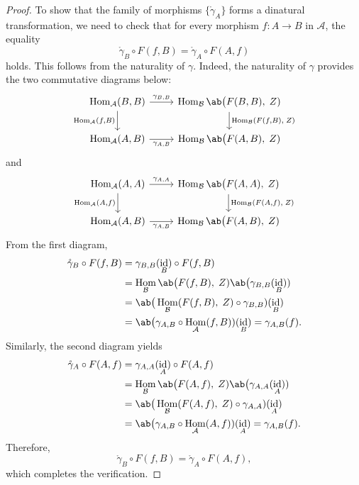 \documentclass[12pt, english]{article}
\numberwithin{equation}{section}
\DeclareMathOperator{\Hom}{Hom}
\DeclareMathOperator{\id}{id}
\theoremstyle{plain}
\theoremstyle{definition}
\theoremstyle{remark}
\begin{document}
	\begin{proof}
		
		To show that the family of morphisms  $\{\mathring{\gamma}_A\}$ forms a dinatural transformation,
		we need to check that for every morphism  $f \colon A \to B$ in $\mathcal{A}$, the equality
		\[
		\mathring{\gamma}_B \circ F(f, B) = \mathring{\gamma}_A \circ F(A, f)
		\]
		holds.  This follows from the naturality of $\gamma$.
		Indeed, the naturality of $\gamma$ provides the two commutative diagrams below:
		\[
		\begin{tikzcd}
			{\Hom_{\mathcal{A}}(B, B)} \arrow[r, "{\gamma_{B, B}}"] \arrow[d, "{\Hom_{\mathcal{A}}(f, B)  }"']
			& {\Hom_{\mathcal{B}} \ab\big(F(B, B), \; Z) } \arrow[d, "{\Hom_{\mathcal{B}}(F(f, B), \;  Z)}"] \\
			{ \Hom_{\mathcal{A}}(A, B) } \arrow[r, "{ \gamma_{A, B} }"'] & \Hom_{\mathcal{B}} \ab\big(F(A, B), \;  Z)
		\end{tikzcd}
		\]
		and
		\[
		\begin{tikzcd}
			{\Hom_{\mathcal{A}}(A, A)} \arrow[r, "{\gamma_{A, A}}"] \arrow[d, "{\Hom_{\mathcal{A}}(A, f)  }"']
			& {\Hom_{\mathcal{B}} \ab\big(F(A, A), \;  Z)} \arrow[d, "{\Hom_{\mathcal{B}} (F(A, f), \;  Z)}"] \\
			{ \Hom_{ \mathcal{A} }(A, B) } \arrow[r, "{ \gamma_{A, B} }"'] & \Hom_{\mathcal{B}} \ab\big(F(A, B), \;  Z)
		\end{tikzcd}
		\]
		From the first diagram,
		\begin{equation}\label{eq:diagonal-naturality}
			\begin{aligned}
				\mathring{\gamma}_B \circ F(f, B) & = \gamma_{B, B}(\id_B) \circ F(f, B) \\
				& = \Hom_{\mathcal{B}} \ab\big(F(f, B), \; Z) \ab\big(\gamma_{B, B} (\id_B)) \\
				& = \ab\big(\Hom_{\mathcal{B}}(F(f, B), \; Z) \circ \gamma_{B, B}) (\id_B) \\
				& = \ab\big(\gamma_{A, B} \circ \Hom_{\mathcal{A}}(f, B)) (\id_B) = \gamma_{A, B}(f).
			\end{aligned}
		\end{equation}
		Similarly, the second diagram yields
		\begin{align*}
			\mathring{\gamma}_A \circ F(A, f) & = \gamma_{A, A}(\id_A) \circ F(A, f) \\
			& = \Hom_{\mathcal{B}} \ab\big(F(A, f), \; Z) \ab\big(\gamma_{A, A} (\id_A)) \\
			& = \ab\big(\Hom_{\mathcal{B}}(F(A, f), \; Z) \circ \gamma_{A, A}) (\id_A) \\
			& = \ab\big(\gamma_{A, B} \circ \Hom_{\mathcal{A}}(A, f)) (\id_A) = \gamma_{A, B}(f).
		\end{align*}
		Therefore,
		\[
		\mathring{\gamma}_B \circ F(f, B) = \mathring{\gamma}_A \circ F(A, f),
		\]
		which completes the verification.
		
	\end{proof}
	
\end{document}
